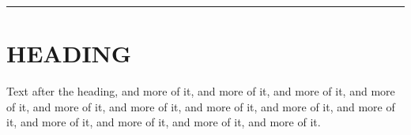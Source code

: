 \documentclass[a4paper,twoside]{book}
\newcommand\roomfor[1]{%
  \clearpage
  \noindent\rule{\linewidth}{0.4pt}\par
  \vspace*{\dimexpr\textheight-\topskip-#1\baselineskip-\baselineskip\relax}%
  \par}
\begin{document}
\roomfor{2}
\section{HEADING}
Text after the heading, and more of it, and more of it, and more of it, and
more of it, and more of it, and more of it, and more of it, and more of it, and
more of it, and more of it, and more of it, and more of it, and more of it.
\end{document}
